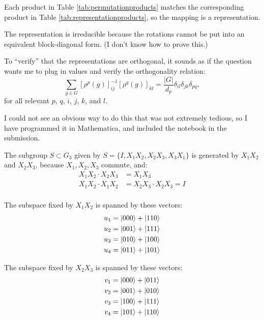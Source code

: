 \documentclass[12pt]{extarticle}
\begin{document}
Each product in Table \ref{tab:permutationproducts} matches the corresponding product in Table \ref{tab:representationproducts}, so the mapping is a representation.

The representation is irreducible because the rotations cannot be put into an equivalent block-diagonal form. (I don't know how to prove this.)

To ``verify'' that the representations are orthogonal, it sounds as if the question wants me to plug in values and verify the orthogonality relation:
\[
\sum_{g\in G} \left[\rho^p(g)\right]_{ij}^{-1} \left[\rho^q(g)\right]_{kl} = \frac{|G|}{d_p} \delta_{il} \delta_{jk} \delta_{pq},
\]
for all relevant $p$, $q$, $i$, $j$, $k$, and $l$.

I could not see an obvious way to do this that was not extremely tedious, so I have programmed it in Mathematica, and included the notebook in the submission.



The subgroup $S\subset G_3$ given by $S = \{I, X_1X_2, X_2X_3, X_3X_1\}$ is generated by $X_1X_2$ and $X_2X_3$,
because $X_1, X_2, X_3$ commute, and:
\begin{align*}
X_1X_2 \cdot X_2X_3 & = X_1X_3 \\
X_1X_2 \cdot X_1X_2 & = X_2X_3 \cdot X_2X_3 = I \\
\end{align*}

The subspace fixed by $X_1X_2$ is spanned by these vectors:
\begin{align*}
u_1 & = \ket{000} + \ket{110} \\
u_2 & = \ket{001} + \ket{111} \\
u_3 & = \ket{010} + \ket{100} \\
u_4 & = \ket{011} + \ket{101} \\
\end{align*}

The subspace fixed by $X_2X_3$ is spanned by these vectors:
\begin{align*}
v_1 & = \ket{000} + \ket{011} \\
v_2 & = \ket{001} + \ket{010} \\
v_3 & = \ket{100} + \ket{111} \\
v_4 & = \ket{101} + \ket{110} \\
\end{align*}
\end{document}

